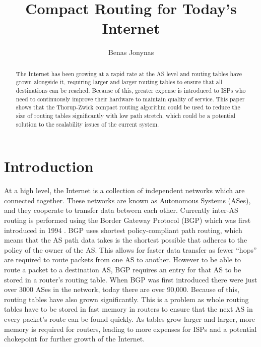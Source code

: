 \documentclass{dissertation/mpaper}
\begin{document}
\title{Compact Routing for Today's Internet}
\author{Benas Jonynas}

\maketitle

\begin{abstract}
    The Internet has been growing at a rapid rate at the AS level and routing tables have grown alongside it, requiring larger and larger routing tables to ensure that all destinations can be reached. Because of this, greater expense is introduced to ISPs who need to continuously improve their hardware to maintain quality of service. This paper shows that the Thorup-Zwick compact routing algorithm could be used to reduce the size of routing tables significantly with low path stretch, which could be a potential solution to the scalability issues of the current system.
\end{abstract}

\section{Introduction}

At a high level, the Internet is a collection of independent networks which are connected together. These networks are known as Autonomous Systems (ASes), and they cooperate to transfer data between each other. Currently inter-AS routing is performed using the Border Gateway Protocol (BGP) which was first introduced in 1994 \cite{rfc4271}. BGP uses shortest policy-compliant path routing, which means that the AS path data takes is the shortest possible that adheres to the policy of the owner of the AS. This allows for faster data transfer as fewer ``hops'' are required to route packets from one AS to another. However to be able to route a packet to a destination AS, BGP requires an entry for that AS to be stored in a router's routing table. When BGP was first introduced there were just over 3000 \cite{RIRStats} ASes in the network, today there are over 90,000. Because of this, routing tables have also grown significantly. This is a problem as whole routing tables have to be stored in fast memory in routers to ensure that the next AS in every packet's route can be found quickly. As tables grow larger and larger, more memory is required for routers, leading to more expenses for ISPs and a potential chokepoint for further growth of the Internet. 
\end{document}
